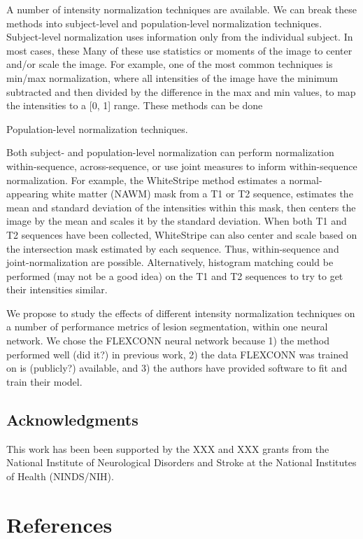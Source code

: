 \documentclass[]{elsarticle} %
\begin{document}
A number of intensity normalization techniques are available. We can break these methods into subject-level and population-level normalization techniques. Subject-level normalization uses information only from the individual subject. In most cases, these
Many of these use statistics or moments of the image to center and/or scale the image. For example, one of the most common techniques is min/max normalization, where all intensities of the image have the minimum subtracted and then divided by the difference in the max and min values, to map the intensities to a {[}0, 1{]} range. These methods can be done

Population-level normalization techniques.

Both subject- and population-level normalization can perform normalization within-sequence, across-sequence, or use joint measures to inform within-sequence normalization. For example, the WhiteStripe method estimates a normal-appearing white matter (NAWM) mask from a T1 or T2 sequence, estimates the mean and standard deviation of the intensities within this mask, then centers the image by the mean and scales it by the standard deviation. When both T1 and T2 sequences have been collected, WhiteStripe can also center and scale based on the intersection mask estimated by each sequence. Thus, within-sequence and joint-normalization are possible. Alternatively, histogram matching could be performed (may not be a good idea) on the T1 and T2 sequences to try to get their intensities similar.

We propose to study the effects of different intensity normalization techniques on a number of performance metrics of lesion segmentation, within one neural network. We chose the FLEXCONN neural network because 1) the method performed well (did it?) in previous work, 2) the data FLEXCONN was trained on is (publicly?) available, and 3) the authors have provided software to fit and train their model.

\hypertarget{acknowledgments}{%
\subsection{Acknowledgments}\label{acknowledgments}}

This work has been been supported by the XXX and XXX grants from the National Institute of Neurological Disorders and Stroke at the National Institutes of Health (NINDS/NIH).

\hypertarget{references}{%
\section*{References}\label{references}}
\end{document}
